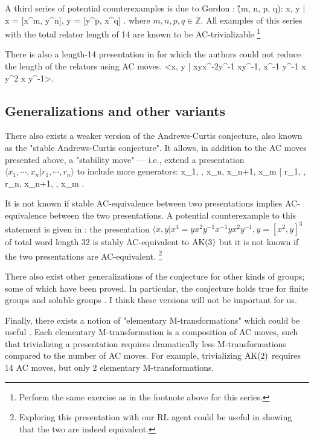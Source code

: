 A third series of potential counterexamples is due to Gordon \cite{Brown}:
\bea
\G(m, n, p, q): \langle x, y | x = [x^m, y^n], y = [y^p, x^q] \rangle.
\eea
where $m,n,p,q \in \mathbb{Z}$.
All examples of this series with the total relator length of 14 are known
to be AC-trivializable \cite{Bowman-McCaul}
\footnote{Perform the same exercise as in the footnote above for this series.}
\newline

There is also a length-14 presentation in \cite{MMS} for which the authors could not reduce the length of the relators using AC moves.
\bea
<x, y | xyx^{-2}y^{-1} xy^{-1}, x^{-1} y^{-1} x y^2 x y^{-1}>.
\eea

\subsection{Generalizations and other variants}

There also exists a weaker version of the Andrews-Curtis conjecture, also known as the "stable Andrews-Curtis conjecture".
It allows, in addition to the AC moves presented above, a "stability move" --- i.e., extend a presentation $\langle x_1, \cdots, x_n | r_1, \cdots, r_n \rangle$ to include more generators:
\bea
\langle x_1, \cdots, x_n, x_{n+1}, \cdots x_m | r_1, \cdots, r_n, x_{n+1}, \cdots, x_m \rangle.
\eea

It is not known if stable AC-equivalence between two presentations implies AC-equivalence between the two presentations.
A potential counterexample to this statement is given in \cite{MMS}: the presentation $\langle x, y | x^4 = y x^2 y^{-1} x^{-1} y x^2 y^{-1}, y = [x^2, y]^3 $ of total word length 32 is stably AC-equivalent to $\text{AK}(3)$ but it is not known if the two presentations are AC-equivalent.
\footnote{Exploring this presentation with our RL agent could be useful in showing that the two are indeed equivalent.}
\newline

There also exist other generalizations of the conjecture for other kinds of groups; some of which have been proved.
In particular, the conjecture holds true for finite groups and soluble groups \cite{Borovik, Guyot}.
I think these versions will not be important for us.
\newline

Finally, there exists a notion of "elementary M-transformations" which could be useful \cite{BurnsI, BurnsII}.
Each elementary M-transformation is a composition of AC moves, such that trivializing a presentation requires dramatically less M-transformations compared to the number of AC moves.
For example, trivializing $\text{AK}(2)$ requires 14 AC moves, but only 2 elementary M-transformations.